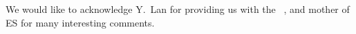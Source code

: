 
We would like to acknowledge Y.~Lan for providing us with
the ~\eqv, and mother of ES for many interesting comments.
